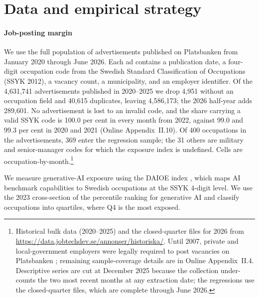 \documentclass[preprint,12pt,authoryear]{elsarticle}
\begin{document}
\section{Data and empirical strategy}\label{sec:data}

\paragraph{Job-posting margin} We use the full population of advertisements published on Platsbanken from January 2020 through June 2026. Each ad contains a publication date, a four-digit occupation code from the Swedish Standard Classification of Occupations (SSYK 2012), a vacancy count, a municipality, and an employer identifier. Of the 4{,}631{,}741 advertisements published in 2020--2025 we drop 4{,}951 without an occupation field and 40{,}615 duplicates, leaving 4{,}586{,}173; the 2026 half-year adds 289{,}601. No advertisement is lost to an invalid code, and the share carrying a valid SSYK code is 100.0 per cent in every month from 2022, against 99.0 and 99.3 per cent in 2020 and 2021 (Online Appendix~II.10). Of 400 occupations in the advertisements, 369 enter the regression sample; the 31 others are military and senior-manager codes for which the exposure index is undefined. Cells are occupation-by-month.\footnote{Historical bulk data (2020--2025) and the closed-quarter files for 2026 from \url{https://data.jobtechdev.se/annonser/historiska/}. Until 2007, private and local-government employers were legally required to post vacancies on Platsbanken \citep{cronert2021regulatory}; remaining sample-coverage details are in Online Appendix~II.4. Descriptive series are cut at December 2025 because the collection under-counts the two most recent months at any extraction date; the regressions use the closed-quarter files, which are complete through June 2026.}

We measure generative-AI exposure using the DAIOE index \citep{engberg2024daioe}, which maps AI benchmark capabilities to Swedish occupations at the SSYK 4-digit level. We use the 2023 cross-section of the percentile ranking for generative AI and classify occupations into quartiles, where Q4 is the most exposed.
\end{document}
